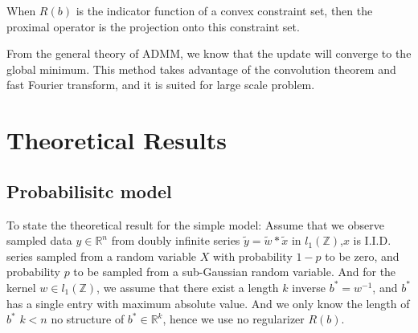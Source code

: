 \documentclass[letter, 10pt]{article}
\numberwithin{equation}{section}
\begin{document}
When $R(b)$ is the indicator function of a convex constraint set, then the proximal operator is the projection onto this constraint set.
  
From the general theory of ADMM, we know that the update will converge to the global minimum. This method takes advantage of the convolution theorem and fast Fourier transform, and it is suited for large scale problem.



 

 
 
 
\section{Theoretical Results}
\subsection{Probabilisitc model}
To state the theoretical result for the simple model:
Assume that we observe sampled data $y\in \mathbb{R}^n$ from doubly infinite series $\tilde y=\tilde w*\tilde x$ in $l_1( \mathbb{Z})$,$x$ is I.I.D. series sampled from a random variable $X$ with probability $1-p$ to be zero, and probability $p$ to be sampled from a sub-Gaussian random variable. 
And for the kernel $w\in l_1( \mathbb{Z})$, we assume that there exist a length $k$ inverse $b^* = w^{-1}$, and $b^*$ has a single entry with maximum absolute value. And we only know the length of $b^*$  $k < n$ no structure of $b^* \in \mathbb{R}^k$, hence we use no regularizer $R(b)$. 
\end{document}

